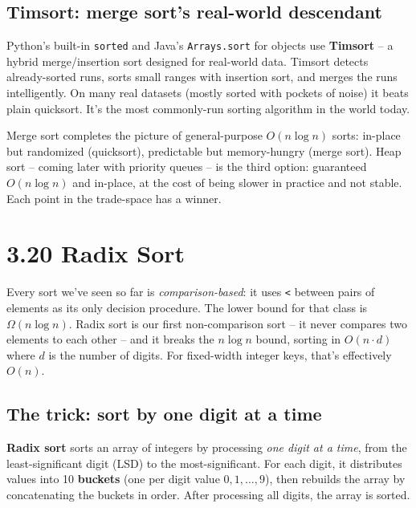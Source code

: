 \documentclass[11pt]{article}
\begin{document}
\subsection*{Timsort: merge sort's real-world descendant}

\begin{notebox}[Timsort]
Python's built-in \texttt{sorted} and Java's
\texttt{Arrays.sort} for objects use \textbf{Timsort} -- a hybrid
merge/insertion sort designed for real-world data. Timsort detects
already-sorted runs, sorts small ranges with insertion sort, and
merges the runs intelligently. On many real datasets (mostly sorted
with pockets of noise) it beats plain quicksort. It's the most
commonly-run sorting algorithm in the world today.
\end{notebox}

\begin{ideabox}
Merge sort completes the picture of general-purpose $O(n \log n)$
sorts: in-place but randomized (quicksort), predictable but
memory-hungry (merge sort). Heap sort -- coming later with priority
queues -- is the third option: guaranteed $O(n \log n)$ and
in-place, at the cost of being slower in practice and not stable.
Each point in the trade-space has a winner.
\end{ideabox}

\section{3.20 Radix Sort}

Every sort we've seen so far is \emph{comparison-based}: it uses
\texttt{<} between pairs of elements as its only decision procedure.
The lower bound for that class is $\Omega(n \log n)$. Radix sort is
our first non-comparison sort -- it never compares two elements to
each other -- and it breaks the $n \log n$ bound, sorting in
$O(n \cdot d)$ where $d$ is the number of digits. For fixed-width
integer keys, that's effectively $O(n)$.

\subsection{The trick: sort by one digit at a time}

\begin{defnbox}
\textbf{Radix sort} sorts an array of integers by processing
\emph{one digit at a time}, from the least-significant digit (LSD)
to the most-significant. For each digit, it distributes values into
10 \textbf{buckets} (one per digit value $0, 1, \ldots, 9$), then
rebuilds the array by concatenating the buckets in order. After
processing all digits, the array is sorted.
\end{defnbox}
\end{document}
